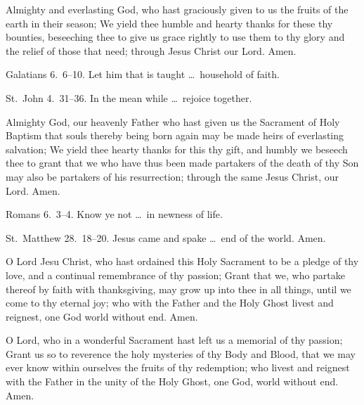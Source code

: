  Almighty and everlasting God, who hast graciously given to us the fruits of the earth in their season; We yield thee humble and hearty thanks for these thy bounties, beseeching thee to give us grace rightly to use them to thy glory and the relief of those that need; through Jesus Christ our Lord. \R Amen.
    
 Galatians 6.~6–10.   Let him that is taught \ldots\ household of faith.

 St.~John 4.~31–36.   In the mean while \ldots\ rejoice together.

\medskip


 Almighty God, our heavenly Father who hast given us the Sacrament of Holy Baptism that souls thereby being born again may be made heirs of everlasting salvation; We yield thee hearty thanks for this thy gift, and humbly we beseech thee to grant that we who have thus been made partakers of the death of thy Son may also be partakers of his resurrection; through the same Jesus Christ, our Lord. \R Amen.

 Romans 6.~3–4.   Know ye not \ldots\ in newness of life.

 St.~Matthew 28.~18–20.   Jesus came and spake \ldots\ end of the world. Amen.


\medskip


 O Lord Jesu Christ, who hast ordained this Holy Sacrament to be a pledge of thy love, and a continual remembrance of thy passion; Grant that we, who partake thereof by faith with thanksgiving, may grow up into thee in all things, until we come to thy eternal joy; who with the Father and the Holy Ghost livest and reignest, one God world without end. \R Amen.

 O Lord, who in a wonderful Sacrament hast left us a memorial of thy passion; Grant us so to reverence the holy mysteries of thy Body and Blood, that we may ever know within ourselves the fruits of thy redemption; who livest and reignest with the Father in the unity of the Holy Ghost, one God, world without end. \R Amen.



